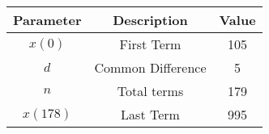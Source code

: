\begin{tabular}{|c|c|c|}
    \hline
     Parameter & Description & Value \\
    \hline
     $x(0)$ & First Term & 105\\
     \hline
     $d$ & Common Difference & 5\\
    \hline
    $n$ & Total terms & 179 \\ 
    \hline
    $x(178)$ & Last Term & 995\\
    \hline
\end{tabular}
